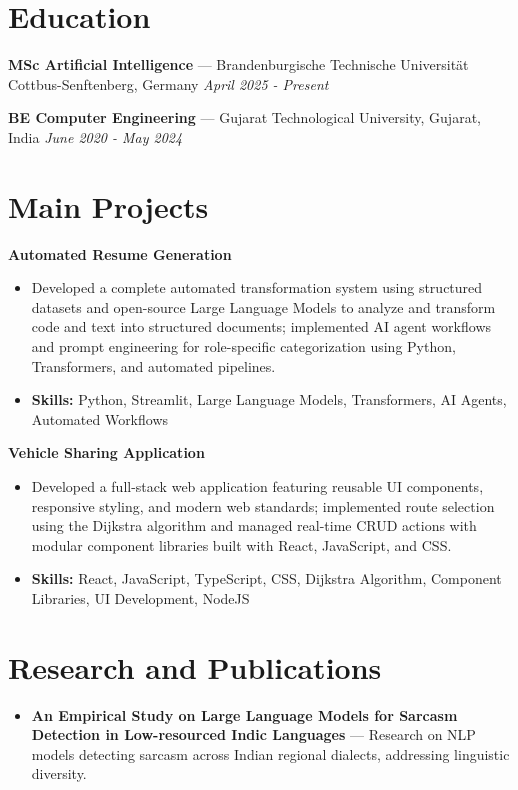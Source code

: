 \documentclass[a4paper,10pt]{article}
\begin{document}
\section*{Education}
\textbf{MSc Artificial Intelligence} — Brandenburgische Technische Universität Cottbus-Senftenberg, Germany \hfill \textit{April 2025 - Present}\par
\vspace{1.5pt}
\textbf{BE Computer Engineering} — Gujarat Technological University, Gujarat, India \hfill \textit{June 2020 - May 2024}\par

\section*{Main Projects}
\textbf{Automated Resume Generation}\par
\vspace{1pt}
\begin{itemize}
  \item Developed a complete automated transformation system using structured datasets and open-source Large Language Models to analyze and transform code and text into structured documents; implemented AI agent workflows and prompt engineering for role-specific categorization using Python, Transformers, and automated pipelines.
  \item \textbf{Skills:} Python, Streamlit, Large Language Models, Transformers, AI Agents, Automated Workflows
\end{itemize}
\vspace{3pt}
\textbf{Vehicle Sharing Application}\par
\vspace{1pt}
\begin{itemize}
  \item Developed a full-stack web application featuring reusable UI components, responsive styling, and modern web standards; implemented route selection using the Dijkstra algorithm and managed real-time CRUD actions with modular component libraries built with React, JavaScript, and CSS.
  \item \textbf{Skills:} React, JavaScript, TypeScript, CSS, Dijkstra Algorithm, Component Libraries, UI Development, NodeJS
\end{itemize}

\section*{Research and Publications}
\begin{itemize}
\item \textbf{An Empirical Study on Large Language Models for Sarcasm Detection in Low-resourced Indic Languages} — Research on NLP models detecting sarcasm across Indian regional dialects, addressing linguistic diversity.
\end{itemize}
\end{document}
